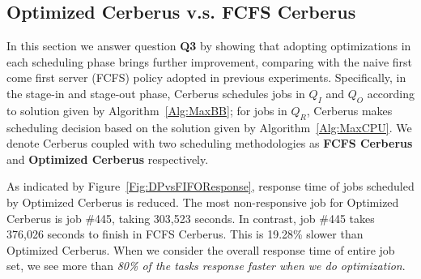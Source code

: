 \subsection{Optimized Cerberus v.s. FCFS Cerberus}

In this section we answer question \textbf{Q3} by showing that
adopting optimizations in each scheduling phase brings further improvement,
comparing with the naive first come first server (FCFS) policy adopted in previous experiments.
Specifically, in the stage-in and stage-out phase, Cerberus schedules jobs in $Q_I$ and $Q_O$
according to solution given by Algorithm~\ref{Alg:MaxBB};
for jobs in $Q_R$, Cerberus makes scheduling decision
based on the solution given by Algorithm~\ref{Alg:MaxCPU}.
We denote Cerberus coupled with two scheduling methodologies 
as \textbf{FCFS Cerberus} and \textbf{Optimized Cerberus} respectively.

As indicated by Figure~\ref{Fig:DPvsFIFOResponse}, response time of
jobs scheduled by Optimized Cerberus is reduced.
The most non-responsive job for Optimized Cerberus is job \#445,
taking 303,523 seconds.
In contrast, job \#445 takes 376,026 seconds to finish in FCFS Cerberus.
This is 19.28\% slower than Optimized Cerberus.
When we consider the overall response time of entire job set,
we see more than \textit{80\% of the tasks response faster when we do optimization}.


